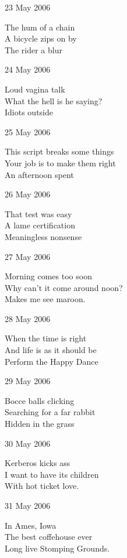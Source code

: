 \documentclass[12pt]{article}
\begin{document}
23 May 2006

The hum of a chain \\
A bicycle zips on by \\
The rider a blur

24 May 2006

Loud vagina talk \\
What the hell is he saying? \\
Idiots outside

25 May 2006

This script breaks some things \\
Your job is to make them right \\
An afternoon spent


\newpage

26 May 2006

That test was easy \\ 
A lame certification \\
Meaningless nonsense

27 May 2006

Morning comes too soon \\
Why can't it come around noon? \\ 
Makes me see maroon.

28 May 2006

When the time is right \\
And life is as it should be \\
Perform the Happy Dance

29 May 2006

Bocce balls clicking \\
Searching for a far rabbit \\
Hidden in the grass

30 May 2006

Kerberos kicks ass \\
I want to have its children \\
With hot ticket love.

31 May 2006

In Ames, Iowa \\
The best coffehouse ever \\
Long live Stomping Grounds.


\newpage
\end{document}
